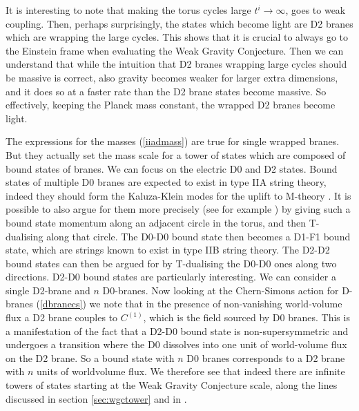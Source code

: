 \documentclass[11pt,a4paper]{article}
\numberwithin{equation}{section}
\numberwithin{table}{section}\setlength{\multlinegap}{25pt}
\begin{document}
It is interesting to note that making the torus cycles large $t^i \rightarrow \infty$, goes to weak coupling. Then, perhaps surprisingly, the states which become light are D2 branes which are wrapping the large cycles. This shows that it is crucial to always go to the Einstein frame when evaluating the Weak Gravity Conjecture. Then we can understand that while the intuition that D2 branes wrapping large cycles should be massive is correct, also gravity becomes weaker for larger extra dimensions, and it does so at a faster rate than the D2 brane states become massive. So effectively, keeping the Planck mass constant, the wrapped D2 branes become light.

The expressions for the masses (\ref{iiadmass}) are true for single wrapped branes. But they actually set the mass scale for a tower of states which are composed of bound states of branes. We can focus on the electric D0 and D2 states. Bound states of multiple D0 branes are expected to exist in type IIA string theory, indeed they should form the Kaluza-Klein modes for the uplift to M-theory \cite{Witten:1995ex}. It is possible to also argue for them more precisely (see for example \cite{Johnson:2003gi}) by giving such a bound state momentum along an adjacent circle in the torus, and then T-dualising along that circle. The D0-D0 bound state then becomes a D1-F1 bound state, which are strings known to exist in type IIB string theory. The D2-D2 bound states can then be argued for by T-dualising the D0-D0 ones along two directions. D2-D0 bound states are particularly interesting. We can consider a single D2-brane and $n$ D0-branes. Now looking at the Chern-Simons action for D-branes (\ref{dbranecs}) we note that  in the presence of non-vanishing world-volume flux a D2 brane couples to $C^{(1)}$, which is the field sourced by D0 branes. This is a manifestation of the fact that a D2-D0 bound state is non-supersymmetric and undergoes a transition where the D0 dissolves into one unit of world-volume flux on the D2 brane. So a bound state with $n$ D0 branes corresponds to a D2 brane with $n$ units of worldvolume flux. We therefore see that indeed there are infinite towers of states starting at the Weak Gravity Conjecture scale, along the lines discussed in section \ref{sec:wgctower} and in \cite{Heidenreich:2015nta,Klaewer:2016kiy,Heidenreich:2016aqi,Andriolo:2018lvp,Grimm:2018ohb}.
\end{document}
